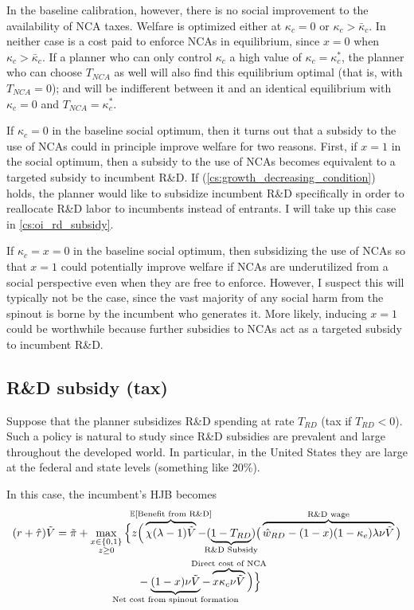 \documentclass[11pt,english]{article}
\theoremstyle{remark}
\begin{document}
In the baseline calibration, however, there is no social improvement to the availability of NCA taxes. Welfare is optimized either at $\kappa_c = 0$ or $\kappa_c > \bar{\kappa}_c$. In neither case is a cost paid to enforce NCAs in equilibrium, since $x = 0$ when $\kappa_c > \bar{\kappa}_c$. If a planner who can only control $\kappa_c$ a high value of $\kappa_c = \kappa_c^*$, the planner who can choose $T_{NCA}$ as well will also find this equilibrium optimal (that is, with $T_{NCA} = 0$); and will be indifferent between it and an identical equilibrium with $\kappa_c = 0$ and $T_{NCA} = \kappa_c^*$. 

If $\kappa_c = 0$ in the baseline social optimum, then it turns out that a subsidy to the use of NCAs could in principle improve welfare for two reasons. First, if $x = 1$ in the social optimum, then a subsidy to the use of NCAs becomes equivalent to a targeted subsidy to incumbent R\&D. If (\ref{cs:growth_decreasing_condition}) holds, the planner would like to subsidize incumbent R\&D specifically in order to reallocate R\&D labor to incumbents instead of entrants. I will take up this case in \autoref{cs:oi_rd_subsidy}.

If $\kappa_c = x = 0$ in the baseline social optimum, then subsidizing the use of NCAs so that $x = 1$ could potentially improve welfare if NCAs are underutilized from a social perspective even when they are free to enforce. However, I suspect this will typically not be the case, since the vast majority of any social harm from the spinout is borne by the incumbent who generates it. More likely, inducing $x = 1$ could be worthwhile because further subsidies to NCAs act as a targeted subsidy to incumbent R\&D.

\subsection{R\&D subsidy (tax)}

Suppose that the planner subsidizes R\&D spending at rate $T_{RD}$ (tax if $T_{RD} < 0$). Such a policy is natural to study since R\&D subsidies are prevalent and large throughout the developed world. In particular, in the United States they are large at the federal and state levels (something like 20\%).

In this case, the incumbent's HJB becomes
\begin{align}
	(r + \hat{\tau}) \tilde{V} = \tilde{\pi} + \max_{\substack{x \in \{0,1\} \\ z \ge 0}} \Big\{z &\Big( \overbrace{\chi (\lambda - 1) \tilde{V}}^{\mathclap{\mathbb{E}[\textrm{Benefit from R\&D}]}}- (\underbrace{1-T_{RD}}_{\mathclap{\text{R\&D Subsidy}}}) \big( \overbrace{\hat{w}_{RD} - (1-x)(1-\kappa_e)\lambda \nu \tilde{V}}^{\mathclap{\text{R\&D wage}}}\big) \label{eq:hjb_incumbent_RDsubsidy} \nonumber \\ 
	&-  \underbrace{(1-x) \nu \tilde{V}}_{\mathclap{\text{Net cost from spinout formation}}} - \overbrace{x \kappa_{c} \nu \tilde{V}}^{\mathclap{\text{Direct cost of NCA}}}\Big) \Big\} 
\end{align}
\end{document}
